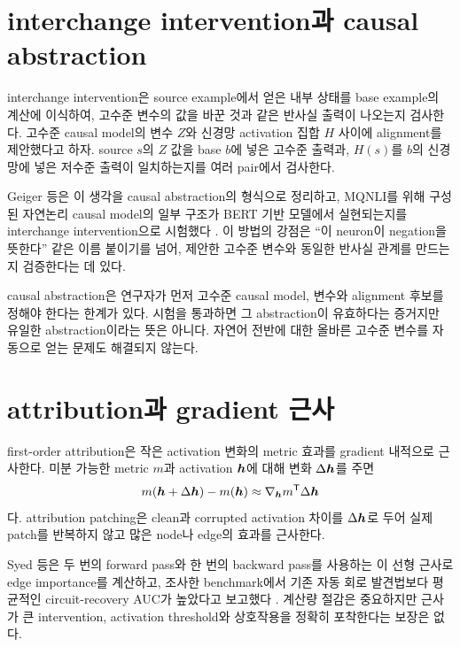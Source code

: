 \section{interchange intervention과 causal abstraction}

interchange intervention은 source example에서 얻은 내부 상태를 base example의 계산에 이식하여, 고수준 변수의 값을 바꾼 것과 같은 반사실 출력이 나오는지 검사한다.
고수준 causal model의 변수 $Z$와 신경망 activation 집합 $H$ 사이에 alignment를 제안했다고 하자.
source $s$의 $Z$ 값을 base $b$에 넣은 고수준 출력과, $H(s)$를 $b$의 신경망에 넣은 저수준 출력이 일치하는지를 여러 pair에서 검사한다.

Geiger 등은 이 생각을 causal abstraction의 형식으로 정리하고, MQNLI를 위해 구성된 자연논리 causal model의 일부 구조가 BERT 기반 모델에서 실현되는지를 interchange intervention으로 시험했다 \citep{geiger2021causal}.
이 방법의 강점은 ``이 neuron이 negation을 뜻한다'' 같은 이름 붙이기를 넘어, 제안한 고수준 변수와 동일한 반사실 관계를 만드는지 검증한다는 데 있다.

causal abstraction은 연구자가 먼저 고수준 causal model, 변수와 alignment 후보를 정해야 한다는 한계가 있다.
시험을 통과하면 그 abstraction이 유효하다는 증거지만 유일한 abstraction이라는 뜻은 아니다.
자연어 전반에 대한 올바른 고수준 변수를 자동으로 얻는 문제도 해결되지 않는다.

\section{attribution과 gradient 근사}

first-order attribution은 작은 activation 변화의 metric 효과를 gradient 내적으로 근사한다.
미분 가능한 metric $m$과 activation $\bm{h}$에 대해 변화 $\Delta\bm{h}$를 주면
\begin{equation}
  m(\bm{h}+\Delta\bm{h})-m(\bm{h})
  \approx \nabla_{\bm{h}}m^{\mathsf T}\Delta\bm{h}
  \label{eq:first-order-attribution}
\end{equation}
다.
attribution patching은 clean과 corrupted activation 차이를 $\Delta\bm{h}$로 두어 실제 patch를 반복하지 않고 많은 node나 edge의 효과를 근사한다.

Syed 등은 두 번의 forward pass와 한 번의 backward pass를 사용하는 이 선형 근사로 edge importance를 계산하고, 조사한 benchmark에서 기존 자동 회로 발견법보다 평균적인 circuit-recovery AUC가 높았다고 보고했다 \citep{syed2023eap}.
계산량 절감은 중요하지만 근사가 큰 intervention, activation threshold와 상호작용을 정확히 포착한다는 보장은 없다.

